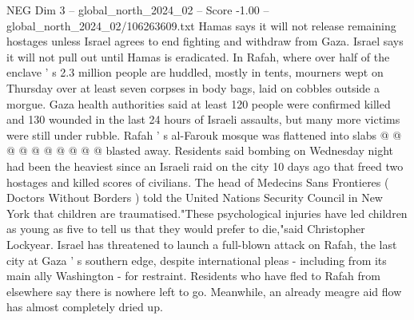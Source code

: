 \begin{textsample}{NEG Dim 3 – global\_north\_2024\_02 – Score -1.00 – global\_north\_2024\_02/106263609.txt}
Hamas says it will not release remaining hostages unless Israel agrees to end fighting and withdraw from Gaza.
Israel says it will not pull out until Hamas is eradicated.
In Rafah, where over half of the enclave ' s 2.3 million people are huddled, mostly in tents, mourners wept on Thursday over at least seven corpses in body bags, laid on cobbles outside a morgue.
Gaza health authorities said at least 120 people were confirmed killed and 130 wounded in the last 24 hours of Israeli assaults, but many more victims were still under rubble.
Rafah ' s al-Farouk mosque was flattened into slabs @ @ @ @ @ @ @ @ @ @ blasted away.
Residents said bombing on Wednesday night had been the heaviest since an Israeli raid on the city 10 days ago that freed two hostages and killed scores of civilians.
The head of Medecins Sans Frontieres ( Doctors Without Borders ) told the United Nations Security Council in New York that children are traumatised."These psychological injuries have led children as young as five to tell us that they would prefer to die,"said Christopher Lockyear.
Israel has threatened to launch a full-blown attack on Rafah, the last city at Gaza ' s southern edge, despite international pleas - including from its main ally Washington - for restraint.
Residents who have fled to Rafah from elsewhere say there is nowhere left to go.
Meanwhile, an already meagre aid flow has almost completely dried up.

\end{textsample}
